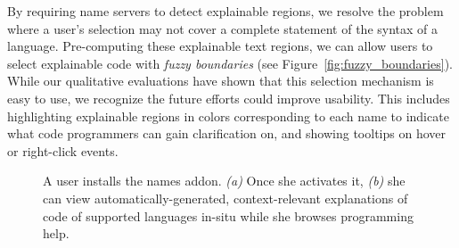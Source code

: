 By requiring \gls{name} servers to detect explainable regions, we resolve the problem where a user's selection may not cover a complete statement of the syntax of a language.
Pre-computing these explainable text regions, we can allow users to select explainable code with \emph{fuzzy boundaries} (see Figure~\ref{fig:fuzzy_boundaries}).
While our qualitative evaluations have shown that this selection mechanism is easy to use, we recognize the future efforts could improve usability.
This includes highlighting explainable regions in colors corresponding to each \gls{name} to indicate what code programmers can gain clarification on, and showing tooltips on hover or right-click events.

\begin{figure}
    \centering
    \label{fig:browser_tutorons_markup}
    \caption{A user installs the \Glspl{name} addon.  \emph{(a)} Once she activates it, \emph{(b)} she can view automatically-generated, context-relevant explanations of code of supported languages in-situ while she browses programming help.}
\end{figure}

